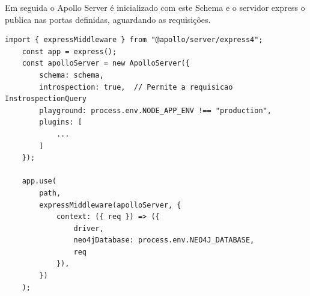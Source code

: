 Em seguida o Apollo Server é inicializado com este Schema e o servidor express o publica nas portas definidas, aguardando as requisições.

\begin{lstlisting}
import { expressMiddleware } from "@apollo/server/express4";
    const app = express();
	const apolloServer = new ApolloServer({
		schema: schema,
		introspection: true,  // Permite a requisicao InstrospectionQuery
		playground: process.env.NODE_APP_ENV !== "production",
		plugins: [
            ...
		]
	});

	app.use(
		path,
		expressMiddleware(apolloServer, {
			context: ({ req }) => ({
				driver,
				neo4jDatabase: process.env.NEO4J_DATABASE,
				req
			}),
		})
	);
\end{lstlisting}


